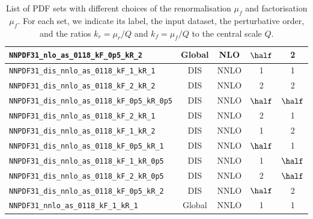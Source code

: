 \begin{table}[t]
\begin{tabular}{lcccc}
     {\tt NNPDF31\_nlo\_as\_0118\_kF\_0p5\_kR\_2}     & Global  & NLO  &  $\half$  &  2 \\
         \midrule
     {\tt NNPDF31\_dis\_nnlo\_as\_0118\_kF\_1\_kR\_1}  & DIS  & NNLO  &  1  &  1  \\
     {\tt NNPDF31\_dis\_nnlo\_as\_0118\_kF\_2\_kR\_2}   & DIS  & NNLO  &  2  &  2  \\
     {\tt NNPDF31\_dis\_nnlo\_as\_0118\_kF\_0p5\_kR\_0p5}   & DIS  & NNLO  &  $\half$  &  $\half$  \\
     {\tt NNPDF31\_dis\_nnlo\_as\_0118\_kF\_2\_kR\_1}    & DIS  & NNLO  &  2  &  1  \\
     {\tt NNPDF31\_dis\_nnlo\_as\_0118\_kF\_1\_kR\_2}  & DIS  & NNLO  &  1  &  2  \\
     {\tt NNPDF31\_dis\_nnlo\_as\_0118\_kF\_0p5\_kR\_1}  & DIS  & NNLO  &  $\half$  &  1  \\
     {\tt NNPDF31\_dis\_nnlo\_as\_0118\_kF\_1\_kR\_0p5}   & DIS  & NNLO  &  1  &  $\half$ \\
     {\tt NNPDF31\_dis\_nnlo\_as\_0118\_kF\_2\_kR\_0p5}   & DIS  & NNLO  &  2  &  $\half$  \\
     {\tt NNPDF31\_dis\_nnlo\_as\_0118\_kF\_0p5\_kR\_2}  & DIS  & NNLO  &  $\half$  &  2  \\
     \midrule
      {\tt NNPDF31\_nnlo\_as\_0118\_kF\_1\_kR\_1}     & Global  & NNLO  &  1  &  1 \\
       \bottomrule
  \end{tabular}
  \vspace{0.3cm}
  \caption{\small List of PDF sets  with different choices of the
    renormalisation $\mu_f$ and factorisation $\mu_f$.
    For each set, we indicate its label, the input dataset,
    the perturbative order, and the ratios $k_r=\mu_r/Q$
    and $k_f=\mu_f/Q$ to the central scale $Q$.
    \label{tab:scalevarFits}
  }
  \end{table}

